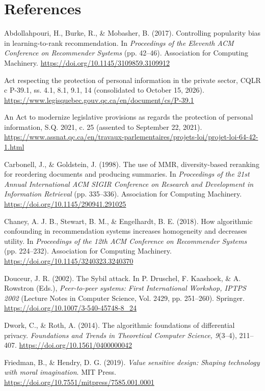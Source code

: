 \documentclass[11pt,letterpaper]{article}
\newenvironment{references}
  {\par\small\raggedright\setlength{\parskip}{3pt plus 1pt}\setlength{\parindent}{0pt}}
  {\par}
\newcommand{\refentry}{\par\noindent\hangindent=0.3in\hangafter=1\relax}
\begin{document}
\section{References}

\begin{references}
\refentry Abdollahpouri, H., Burke, R., \& Mobasher, B. (2017). Controlling popularity bias in
learning-to-rank recommendation. In \textit{Proceedings of the Eleventh ACM Conference on Recommender Systems}
(pp. 42--46). Association for Computing Machinery. \url{https://doi.org/10.1145/3109859.3109912}

\refentry Act respecting the protection of personal information in the private sector, CQLR c P-39.1, ss. 4.1,
8.1, 9.1, 14 (consolidated to October 15, 2026).
\url{https://www.legisquebec.gouv.qc.ca/en/document/cs/P-39.1}

\refentry An Act to modernize legislative provisions as regards the protection of personal information, S.Q.
2021, c. 25 (assented to September 22, 2021).
\url{https://www.assnat.qc.ca/en/travaux-parlementaires/projets-loi/projet-loi-64-42-1.html}

\refentry Carbonell, J., \& Goldstein, J. (1998). The use of MMR, diversity-based reranking for reordering
documents and producing summaries. In \textit{Proceedings of the 21st Annual International ACM SIGIR
Conference on Research and Development in Information Retrieval} (pp. 335--336). Association for Computing
Machinery. \url{https://doi.org/10.1145/290941.291025}

\refentry Chaney, A. J. B., Stewart, B. M., \& Engelhardt, B. E. (2018). How algorithmic confounding in
recommendation systems increases homogeneity and decreases utility. In \textit{Proceedings of the 12th ACM
Conference on Recommender Systems} (pp. 224--232). Association for Computing Machinery.
\url{https://doi.org/10.1145/3240323.3240370}

\refentry Douceur, J. R. (2002). The Sybil attack. In P. Druschel, F. Kaashoek, \& A. Rowstron (Eds.),
\textit{Peer-to-peer systems: First International Workshop, IPTPS 2002} (Lecture Notes in Computer Science,
Vol. 2429, pp. 251--260). Springer. \url{https://doi.org/10.1007/3-540-45748-8_24}

\refentry Dwork, C., \& Roth, A. (2014). The algorithmic foundations of differential privacy.
\textit{Foundations and Trends in Theoretical Computer Science, 9}(3--4), 211--407.
\url{https://doi.org/10.1561/0400000042}

\refentry Friedman, B., \& Hendry, D. G. (2019). \textit{Value sensitive design: Shaping technology with moral
imagination}. MIT Press. \url{https://doi.org/10.7551/mitpress/7585.001.0001}


\end{references}
\end{document}
